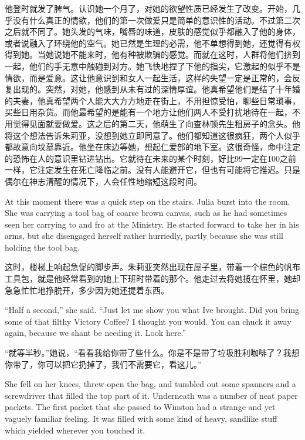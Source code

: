 \begin{paracol}{2}
\switchcolumn

他登时就发了脾气。认识她一个月了，对她的欲望性质已经发生了改变。开始，几乎没有什么真正的情欲，他们的第一次做爱只是简单的意识性的活动。不过第二次之后就不同了。她头发的气味，嘴唇的味道，皮肤的感觉似乎都融入了他的身体，或者说融入了环绕他的空气。她已然是生理的必需，他不单想得到她，还觉得有权得到她。当她说她不能来时，他有种被欺骗的感觉。而就在这时，人群将他们挤到一起，他们的手无意中触碰到对方。她飞快地捏了下他的指尖，它激起的似乎不是情欲，而是爱意。这让他意识到和女人一起生活，这样的失望一定是正常的，会反复出现的。突然，对她，他感到从未有过的深情厚谊。他真希望他们是结了十年婚的夫妻，他真希望两个人能大大方方地走在街上，不用担惊受怕，聊些日常琐事，买些日用杂货。而他最希望的是能有一个地方让他们两人不受打扰地待在一起，不用觉得见面就要做爱。这之后的第二天，他萌生了向查林顿先生租房子的念头。他将这个想法告诉朱莉亚，没想到她立即同意了。他们都知道这很疯狂，两个人似乎都故意向坟墓靠近。他坐在床边等她，想起仁爱部的地下室。这很奇怪，命中注定的恐怖在人的意识里钻进钻出。它就待在未来的某个时刻，好比99一定在100之前一样，它注定发生在死亡降临之前。没有人能避开它，但也有可能将它推迟。只是偶尔在神志清醒的情况下，人会任性地缩短这段时间。

\switchcolumn*

At this moment there was a quick step on the stairs. Julia burst into
the room. She was carrying a tool bag of coarse brown canvas, such as he
had sometimes seen her carrying to and fro at the Ministry. He started
forward to take her in his arms, but she disengaged herself rather
hurriedly, partly because she was still holding the tool bag.

\switchcolumn

这时，楼梯上响起急促的脚步声。朱莉亚突然出现在屋子里，带着一个棕色的帆布工具包，就是他经常看到的她上下班时带着的那个。他走过去将她揽在怀里，她却急急忙忙地挣脱开，多少因为她还提着东西。

\switchcolumn*

``Half a second,'' she said. ``Just let me show you what
I\textquotesingle ve brought. Did you bring some of that filthy Victory
Coffee? I thought you would. You can chuck it away again, because we
shan\textquotesingle t be needing it. Look here.''

\switchcolumn

``就等半秒。''她说，``看看我给你带了些什么。你是不是带了垃圾胜利咖啡了？我想你带了，你可以把它扔掉了，我们不需要它，看这儿。''

\switchcolumn*

She fell on her knees, threw open the bag, and tumbled out some spanners
and a screwdriver that filled the top part of it. Underneath was a
number of neat paper packets. The first packet that she passed to
Winston had a strange and yet vaguely familiar feeling. It was filled
with some kind of heavy, sandlike stuff which yielded wherever you
touched it.


\end{paracol}
